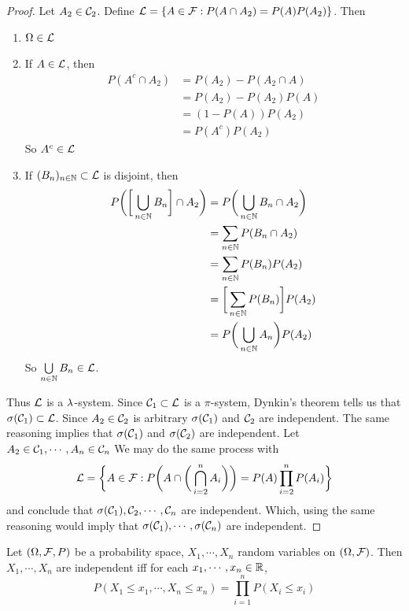 \documentclass{book}
\begin{document}
	\begin{proof}
		Let $A_2 \in \mathcal{C}_2$. Define $\mathcal{L} = \{A \in \mathcal{F}: P(A\cap A_2) = P(A)P(A_2)\}$. Then 
		\begin{enumerate}
			\item $\Omega \in \mathcal{L}$
			\item If $A \in \mathcal{L}$, then 
			\begin{align*}
				P(A^c \cap A_2) 
				&= P(A_2) - P(A_2 \cap A) \\
				&= P(A_2) - P(A_2) P(A) \\
				&= (1- P(A))P(A_2) \\
				&= P(A^c)P(A_2)
			\end{align*}
			So $A^c \in \mathcal{L}$
			\item If $(B_n)_{n \in \mathbb{N}} \subset \mathcal{L}$ is disjoint, then 
			\begin{align*}
				P\bigg( \bigg[\bigcup_{n \in \mathbb{N}}B_n \bigg] \cap A_2\bigg) 
				&= P \bigg( \bigcup_{n \in \mathbb{N}}B_n \cap A_2 \bigg) \\
				&= \sum_{n \in \mathbb{N}}P(B_n \cap A_2) \\
				&= \sum_{n \in \mathbb{N}}P(B_n) P(A_2) \\
				&=   \bigg[\sum_{n \in \mathbb{N}}P(B_n)\bigg]P(A_2)  \\
				&=  P\bigg( \bigcup_{n \in \mathbb{N}} A_n\bigg) P(A_2) 
			\end{align*} 
			So $\bigcup\limits_{n \in \mathbb{N}}B_n \in \mathcal{L}$. 
		\end{enumerate}
		Thus $\mathcal{L}$ is a $\lambda$-system. Since $\mathcal{C}_1 \subset \mathcal{L}$ is a $\pi$-system, Dynkin's theorem tells us that $\sigma(\mathcal{C}_1) \subset \mathcal{L}$. Since $A_2 \in \mathcal{C}_2$ is arbitrary $\sigma(\mathcal{C}_1)$ and $\mathcal{C}_2$ are independent. The same reasoning implies that $\sigma(\mathcal{C}_1)$ and $\sigma(\mathcal{C}_2)$ are independent. Let $A_2 \in \mathcal{C}_1, \cdots, A_n \in \mathcal{C}_n$ We may do the same process with $$\mathcal{L} = \bigg \{A \in \mathcal{F}: P\bigg(A \cap \bigg(\bigcap_{i=2}^n A_i\bigg) \bigg) = P(A)\prod_{i=2}^n P(A_i)\bigg\}$$ and conclude that $\sigma(\mathcal{C}_1), \mathcal{C}_2, \cdots, \mathcal{C}_n$ are independent. Which, using the same reasoning would imply that $\sigma(\mathcal{C}_1), \cdots, \sigma(\mathcal{C}_n)$ are independent.
	\end{proof}
	
	\begin{ex}
		Let $(\Omega, \mathcal{F}, P)$ be a probability space, $X_1, \cdots, X_n$ random variables on $(\Omega, \mathcal{F})$. Then $X_1, \cdots, X_n$ are independent iff for each $x_1, \cdots, x_n \in \mathbb{R}$, $$P(X_1 \leq x_1, \cdots, X_n \leq x_n ) = \prod_{i=1}^nP(X_i \leq x_i)$$
	\end{ex}
	
\end{document}
